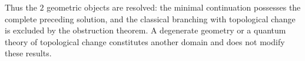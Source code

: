 Thus the \(2\) geometric objects are resolved: the minimal continuation
possesses the complete preceding solution, and
the classical branching with topological change is excluded by the obstruction
theorem. A degenerate geometry or a quantum theory of topological
change constitutes another domain and does not modify these results.
